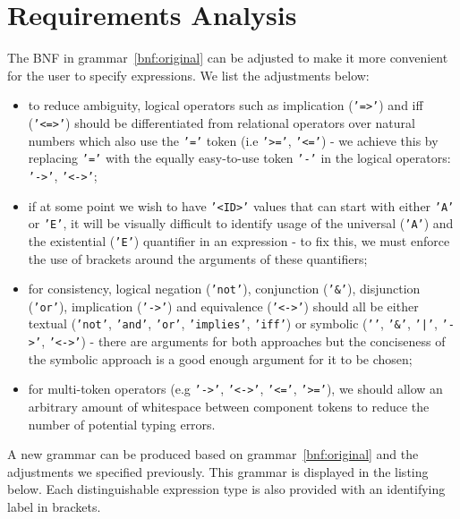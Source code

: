 \documentclass[12pt,oneside,a4paper,notitlepage]{report}
\newcommand{\texttilde}{\raisebox{0.5ex}{\texttildelow}}
\begin{document}
	\section*{Requirements Analysis}
	\par The BNF in grammar~\ref{bnf:original} can be adjusted to make it more convenient for the user to specify expressions. We list the adjustments below:
	\begin{itemize}
		\item to reduce ambiguity, logical operators such as implication (\texttt{'=\textgreater'}) and iff (\texttt{'\textless=\textgreater'}) should be differentiated from relational operators over natural numbers which also use the \texttt{'='} token (i.e \texttt{'\textgreater='}, \texttt{'\textless='}) - we achieve this by replacing \texttt{'='} with the equally easy-to-use token \texttt{'-'} in the logical operators: \texttt{'-\textgreater'}, \texttt{'\textless-\textgreater'};
		\item if at some point we wish to have \texttt{'\textless ID\textgreater'} values that can start with either \texttt{'A'} or \texttt{'E'}, it will be visually difficult to identify usage of the universal (\texttt{'A'}) and the existential (\texttt{'E'}) quantifier in an expression - to fix this, we must enforce the use of brackets around the arguments of these quantifiers;
		\item for consistency, logical negation (\texttt{'not'}), conjunction (\texttt{'\&'}), disjunction (\texttt{'or'}), implication (\texttt{'-\textgreater'}) and equivalence (\texttt{'\textless-\textgreater'}) should all be either textual (\texttt{'not'}, \texttt{'and'}, \texttt{'or'}, \texttt{'implies'}, \texttt{'iff'}) or symbolic (\texttt{'\texttilde'}, \texttt{'\&'}, \texttt{'|'}, \texttt{'-\textgreater'}, \texttt{'\textless-\textgreater'}) - there are arguments for both approaches but the conciseness of the symbolic approach is a good enough argument for it to be chosen;
		\item for multi-token operators (e.g \texttt{'-\textgreater'}, \texttt{'\textless-\textgreater'}, \texttt{'\textless='}, \texttt{'\textgreater='}), we should allow an arbitrary amount of whitespace between component tokens to reduce the number of potential typing errors.
	\end{itemize}

	\bigskip

	\newpage
	\par A new grammar can be produced based on grammar~\ref{bnf:original} and the adjustments we specified previously. This grammar is displayed in the listing below. Each distinguishable expression type is also provided with an identifying label in brackets.
		
\end{document}

